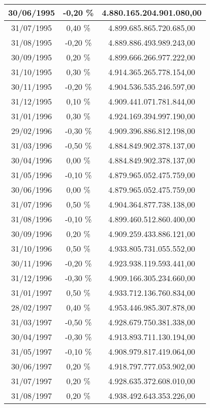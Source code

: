 \begin{center}
\begin{longtable}{|c|c|c|}
30/06/1995 & -0,20 \% & 4.880.165.204.901.080,00  \\ \hline
31/07/1995 & 0,40 \% & 4.899.685.865.720.685,00  \\ \hline
31/08/1995 & -0,20 \% & 4.889.886.493.989.243,00  \\ \hline
30/09/1995 & 0,20 \% & 4.899.666.266.977.222,00  \\ \hline
31/10/1995 & 0,30 \% & 4.914.365.265.778.154,00  \\ \hline
30/11/1995 & -0,20 \% & 4.904.536.535.246.597,00  \\ \hline
31/12/1995 & 0,10 \% & 4.909.441.071.781.844,00  \\ \hline
31/01/1996 & 0,30 \% & 4.924.169.394.997.190,00  \\ \hline
29/02/1996 & -0,30 \% & 4.909.396.886.812.198,00  \\ \hline
31/03/1996 & -0,50 \% & 4.884.849.902.378.137,00  \\ \hline
30/04/1996 & 0,00 \% & 4.884.849.902.378.137,00  \\ \hline
31/05/1996 & -0,10 \% & 4.879.965.052.475.759,00  \\ \hline
30/06/1996 & 0,00 \% & 4.879.965.052.475.759,00  \\ \hline
31/07/1996 & 0,50 \% & 4.904.364.877.738.138,00  \\ \hline
31/08/1996 & -0,10 \% & 4.899.460.512.860.400,00  \\ \hline
30/09/1996 & 0,20 \% & 4.909.259.433.886.121,00  \\ \hline
31/10/1996 & 0,50 \% & 4.933.805.731.055.552,00  \\ \hline
30/11/1996 & -0,20 \% & 4.923.938.119.593.441,00  \\ \hline
31/12/1996 & -0,30 \% & 4.909.166.305.234.660,00  \\ \hline
31/01/1997 & 0,50 \% & 4.933.712.136.760.834,00  \\ \hline
28/02/1997 & 0,40 \% & 4.953.446.985.307.878,00  \\ \hline
31/03/1997 & -0,50 \% & 4.928.679.750.381.338,00  \\ \hline
30/04/1997 & -0,30 \% & 4.913.893.711.130.194,00  \\ \hline
31/05/1997 & -0,10 \% & 4.908.979.817.419.064,00  \\ \hline
30/06/1997 & 0,20 \% & 4.918.797.777.053.902,00  \\ \hline
31/07/1997 & 0,20 \% & 4.928.635.372.608.010,00  \\ \hline
31/08/1997 & 0,20 \% & 4.938.492.643.353.226,00  \\ \hline

\end{longtable}
\end{center}
